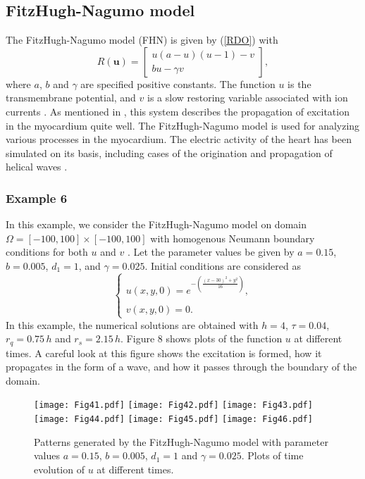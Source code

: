 \documentclass[12pt]{article}
\numberwithin{equation}{section}
\begin{document}
\subsection{FitzHugh-Nagumo model}
The FitzHugh-Nagumo model (FHN) \cite{Fitz1,Fitz2, Nagu} is given by (\ref{RDO}) with
\begin{equation}
R(\mathbf u) = \left[ \begin{array}{l}
u (a - u )(u-1)-v\\
b u - \gamma v
\end{array} \right],\end{equation}
where $a$, $b$ and $\gamma$ are specified positive constants. The function $u$ is the transmembrane potential, and $v$ is a
slow restoring variable associated with ion currents \cite{Fitz1,Fitz2, Nagu}. As mentioned in \cite{FitzNagu, Sund}, this system describes the propagation of
excitation in the myocardium quite well. The FitzHugh-Nagumo model is used for analyzing various processes in the
myocardium. The electric activity of the heart has been simulated on its basis, including cases of the origination and propagation of helical waves \cite{Elkin,Medved}.

\subsubsection{Example 6}
In this example, we consider the FitzHugh-Nagumo model on domain $\Omega  = [-100,100] \times [-100,100]$ with homogenous Neumann boundary conditions for both $u$ and $v$ \cite{FitzNagu}. Let the parameter values be given by
$a = 0.15$, $b = 0.005$, $d_1=1$, and $\gamma =0.025$. Initial conditions are considered as
\[\left\{ {\begin{array}{*{20}{l}}
{u(x,y,0) = {e^{ - \left( {\frac{{{{(x - 30)}^2} + {y^2}}}{{16}}} \right)}},}\\
{}\\
{v(x,y,0) = 0.}
\end{array}} \right.\]
In this example, the numerical solutions are obtained with $h=4$, $\tau=0.04$, $r_q=0.75\,h$ and $r_s=2.15\,h$.
Figure 8 shows plots of the function $u$ at different times. A careful look at this figure shows the excitation is formed, how it propagates in the form of a wave, and how it passes through the boundary of the domain.
\begin{figure}\label{FHNF}
\begin{center}
\texttt{[image: Fig41.pdf]}
\texttt{[image: Fig42.pdf]}
\texttt{[image: Fig43.pdf]}
\texttt{[image: Fig44.pdf]}
\texttt{[image: Fig45.pdf]}
\texttt{[image: Fig46.pdf]}
\caption{Patterns generated by the FitzHugh-Nagumo model with parameter values $a = 0.15$, $b = 0.005$, $d_1=1$ and $\gamma = 0.025$. Plots of time
evolution of $u$ at different times. }
\end{center}
\end{figure}
\end{document}
